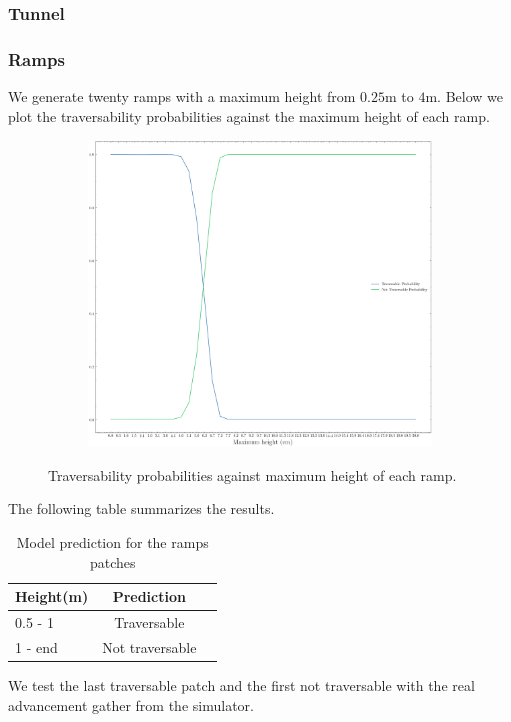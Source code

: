 \documentclass[../document.tex]{subfiles}
\begin{document}
\subsubsection{Tunnel}

\subsubsection{Ramps}
We generate twenty ramps with a maximum height from $0.25$m to $4$m. Below we plot the traversability probabilities against the maximum height of each ramp.
\begin{figure}[H]
    \centering
\begin{subfigure}[b]{1\textwidth}
    \includegraphics[width=\linewidth]{../img/5/custom_patches/ramp/predictions.png}
    \end{subfigure}
    \caption{Traversability probabilities against maximum height of each ramp.}
\end{figure}
The following table summarizes the results.

\begin{table}[H]
    \centering
    \begin{tabular}{l|cc}
        Height(m) & Prediction \\ 
        \hline
        0.5 - 1  &  Traversable \\ 
        1 - end & Not traversable \\ 
        \hline
    \end{tabular}
    \caption{Model prediction for the ramps patches}
\end{table}
We test the last traversable patch and the first not traversable with the real advancement gather from the simulator.
\end{document}
